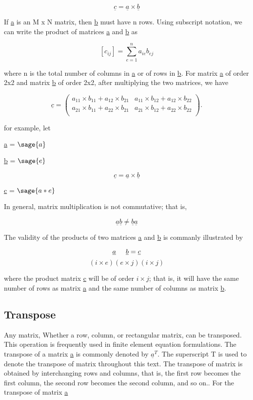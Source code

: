 \documentclass[12pt]{report}
\begin{document}
\[\underline{c} = \underline{a} \times \underline{b}\]

If \underline{a} is an M x N matrix, then \underline{b} must have n
rows. Using subscript notation, we can write the product of matrices
\underline{a} and \underline{b} as

\[[c_{{ij}}] = \sum_{e=1}^{n} {a_{ie}}{b_{ej}}\]

where n is the total number of columns in \underline{a} or of rows in
\underline{b}. For matrix \underline{a} of order 2x2 and matrix
\underline{b} of order 2x2, after multiplying the two matrices, we
have

\[\underline{c}=\left(\begin{array}{rrrrrr}
a_{11} \times b_{11} + a_{12} \times b_{21} & a_{11} \times b_{12} + a_{12} \times b_{22}\\
a_{21} \times b_{11} + a_{22} \times b_{21} & a_{21} \times b_{12} + a_{22} \times b_{22}\\
\end{array}\right).\]

for example, let 

\begin{center}
\underline{a} = $\sage{a}$

\underline{b} = $\sage{e}$


\[\underline{c} = \underline{a} \times \underline{b}\]


\underline{c} = $\sage{a*e}$
\end{center}

In general, matrix multiplication is not commutative; that is,

\[ \underline{a}\underline{b} \neq \underline{b}\underline{a} \]

The validity of the products of two matrices \underline{a} and
\underline{b} is commanly illustrated by

\[ \underline{a} \hspace{0.5cm} \underline{b} = \underline{c} \]
\[ (i \times e)(e \times j) (i \times j) \]

where the product matrix \underline{c} will be of order $i \times j$;
that is, it will have the same number of rows as matrix \underline{a}
and the same number of columns as matrix \underline{b}.

\subsection{Transpose}
Any matrix, Whether a row, column, or rectangular matrix, can be
transposed. This operation is frequently used in finite element
equation formulations. The transpose of a matrix \underline{a} is
commonly denoted by $\underline{a}^T$. The superscript T is used to
denote the transpose of matrix throughout this text. The transpose of
matrix is obtained by interchanging rows and columns, that is, the
first row becomes the first column, the second row becomes the second
column, and so on.. For the transpose of matrix \underline{a}
\end{document}
